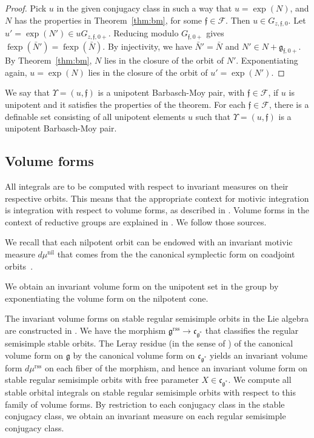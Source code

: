 \documentclass[12pt]{amsart}
\newcommand{\op}[1]{\operatorname{#1}}
\def\Y{\Upsilon}
\def\s{{\mathfrak{f}}}
\newcommand{\cF}{\mathcal{F}}
\newcommand{\fg}{\mathfrak{g}}
\newcommand{\fc}{\mathfrak{c}}
\newcommand{\reg}{\mathrm{rss}}
\theoremstyle{plain}
\theoremstyle{definition}
\begin{document}
\begin{proof}
  Pick $u$ in the given conjugacy class in such a way that $u =
  \exp(N)$, and $N$ has the properties in Theorem~\ref{thm:bm}, for
  some $\s\in \cF$.
  Then $u\in G_{z,\s,0}$.  Let $u' = \exp(N') \in u G_{z,\s,0+}$.
  Reducing modulo
  $G_{\s,0+}$ gives $\op{fexp}(\bar N') = \op{fexp}(\bar N)$. By
  injectivity, we have $\bar N' = \bar N$ and $N' \in N +
  \fg_{\s,0+}$.  By Theorem~\ref{thm:bm}, $N$ lies in the closure of the
  orbit of $N'$.  Exponentiating again, $u = \exp(N)$ lies in the
  closure of the orbit of $u' = \exp(N')$.
\end{proof}

We say that $\Y=(u,\s)$ is a unipotent Barbasch-Moy pair, with $\s\in
\cF$, if $u$ is unipotent and it satisfies the properties of the
theorem.  For each $\s\in \cF$, there is a definable set consisting of
all unipotent elements $u$ such that $\Y=(u,\s)$ is a unipotent
Barbasch-Moy pair.


\subsection{Volume forms}\label{sec:volume}

All integrals are to be computed with respect to invariant measures on
their respective orbits.  This means that the appropriate context for
motivic integration is integration with respect to volume forms, as
described in \cite[\S 8]{CL}.  Volume forms in the context of
reductive groups are explained in \cite{CGH}.  We follow those
sources.

We recall that each nilpotent orbit can be endowed with an invariant
motivic measure $d\mu^{\op{nil}}$ that comes from the the canonical
symplectic form on coadjoint orbits~\cite[Prop.~4.3]{CGH}.  

We obtain an invariant volume form on the unipotent set in the
group by exponentiating the volume form on the nilpotent cone.

The invariant volume forms on stable regular semisimple orbits in the
Lie algebra are constructed in \cite{CHL}.  We have the morphism
$\fg^\reg\to\fc_{\fg^*}$ that classifies the regular semisimple stable
orbits.  The Leray residue (in the sense of \cite{CL}) of the
canonical volume form on $\fg$ by the canonical volume form on
$\fc_{\fg^*}$ yields an invariant volume form $d\mu^\reg$ on each
fiber of the morphism, and hence an invariant volume form on stable
regular semisimple orbits with free parameter $X\in\fc_{\fg^*}$.  We
compute all stable orbital integrals on stable regular semisimple
orbits with respect to this family of volume forms.  By restriction to
each conjugacy class in the stable conjugacy class, we obtain an
invariant measure on each regular semisimple conjugacy class.
\end{document}

